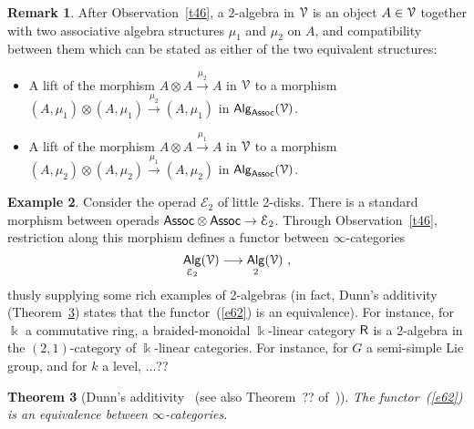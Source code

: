 \documentclass{amsart}
\newtheorem{theorem}{Theorem}[section]
\theoremstyle{definition}
\newtheorem{remark}[theorem]{Remark}
\newtheorem{example}[theorem]{Example}
\theoremstyle{remark}
\DeclareMathOperator{\Alg}{\sf Alg}
\def\ot{\otimes}
\newcommand{\xra}{\xrightarrow}
\def\cE{\mathcal E}\def\cF{\mathcal F}\def\cG{\mathcal G}\def\cH{\mathcal H}
\begin{document}
\begin{remark}
\label{r12}
After Observation~\ref{t46}, a $2$-algebra in $\mathcal V$ is an object $A\in \mathcal V$ together with two associative algebra structures $\mu_1$ and $\mu_2$ on $A$, and compatibility between them which can be stated as either of the two equivalent structures:
\begin{itemize} 

\item
A lift of the morphism $A\ot A \xra{\mu_2} A$ in $\mathcal V$ to a morphism $(A,\mu_1)\otimes (A,\mu_1) \xra{\mu_2} (A,\mu_1)$ in $\Alg_{\sf Assoc}(\cV)$.

\item
A lift of the morphism $A\ot A \xra{\mu_1} A$ in $\mathcal V$ to a morphism $(A,\mu_2)\otimes (A,\mu_2) \xra{\mu_1} (A,\mu_2)$ in $\Alg_{\sf Assoc}(\cV)$.

\end{itemize}

\end{remark}



\begin{example}
\label{r13}
Consider the operad $\cE_2$ of little 2-disks.  
There is a standard morphism between operads ${\sf Assoc}\ot{\sf Assoc} \to \cE_2$.
Through Observation~\ref{t46}, restriction along this morphism defines a functor between $\infty$-categories
\begin{equation}
\label{e62}
\Alg_{\cE_2}(\cV)
\longrightarrow
\Alg_2(\cV)
~,
\end{equation}
thusly supplying some rich examples of 2-algebras (in fact, Dunn's additivity (Theorem~\ref{t48}) states that the functor~(\ref{e62}) is an equivalence). 
For instance, for $\Bbbk$ a commutative ring, a braided-monoidal $\Bbbk$-linear category $\mathsf R$ is a 2-algebra in the $(2,1)$-category of $\Bbbk$-linear categories.  
{\color{magenta}
For instance, for $G$ a semi-simple Lie group, and for $k$ a level, ...??
}
 



\end{example}













\begin{theorem}[Dunn's additivity~\cite{dunn} (see also Theorem~?? of~\cite{HA})]
\label{t48}
The functor~(\ref{e62})
is an equivalence between $\infty$-categories.

\end{theorem}
\end{document}
